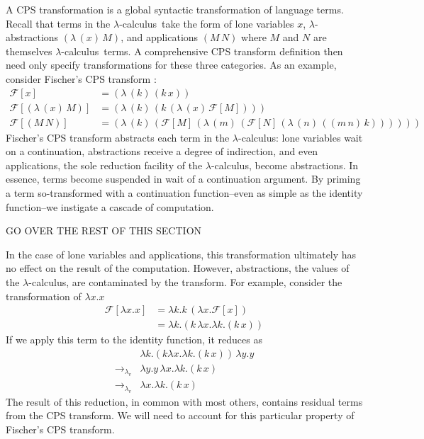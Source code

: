 \documentclass[ms,electronic,twosidetoc,letterpaper,chaptercenter,parttop]{byumsphd}
\newcommand{\lc}{$\lambda$-calculus}
\newcommand{\lvrr}{\rightarrow_{\lambda_v}}
\newcommand{\abs}[2]{(\lambda\,(#1)\,#2)}
\newcommand{\app}[2]{(#1\,#2)}
\begin{document}
A CPS transformation is a global syntactic transformation of language terms. Recall that
terms in the \lc\ take the form of lone variables $x$, $\lambda$-abstractions
$\abs{x}{M}$, and applications $\app{M}{N}$ where $M$ and $N$ are themselves \lc\ terms. A
comprehensive CPS transform definition then need only specify transformations for these
three categories. As an example, consider Fischer's CPS transform \cite{fischer1972lambda}:
\begin{align*}
\mathcal{F}[x]          &= \abs{k}{\app{k}{x}}\\
\mathcal{F}[\abs{x}{M}] &= \abs{k}{\app{k}{\abs{x}{\mathcal{F}[M]}}}\\
\mathcal{F}[\app{M}{N}] &= \abs{k}{\app{\mathcal{F}[M]}{\abs{m}{\app{\mathcal{F}[N]}{\abs{n}{\app{\app{m}{n}}{k}}}}}}
\end{align*}
Fischer's CPS transform abstracts each term in the \lc: lone variables wait on a
continuation, abstractions receive a degree of indirection, and even applications, the
sole reduction facility of the \lc, become abstractions. In essence, terms become
suspended in wait of a continuation argument. By priming a term so-transformed with a
continuation function--even as simple as the identity function--we instigate a cascade of
computation.

GO OVER THE REST OF THIS SECTION

In the case of lone variables and applications, this transformation ultimately has no
effect on the result of the computation. However, abstractions, the values of the
\lc, are contaminated by the transform. For example, consider the
transformation of $\lambda x.x$
\begin{align*}
\mathcal{F}[\lambda x.x] &= \lambda k.k\,(\lambda x.\mathcal{F}[x])\\
                         &= \lambda k.(k\,\lambda x.\lambda k.(k\,x))
\end{align*}
If we apply this term to the identity function, it reduces as
\begin{align*}
                        &\lambda k.(k \lambda x.\lambda k.(k\,x))\,\lambda y.y\\
\lvrr &\lambda y.y\,\lambda x.\lambda k.(k\,x)\\
\lvrr &\lambda x.\lambda k.(k\,x)
\end{align*}
The result of this reduction, in common with most others, contains residual terms from the
CPS transform. We will need to account for this particular property of Fischer's CPS
transform.
\end{document}
